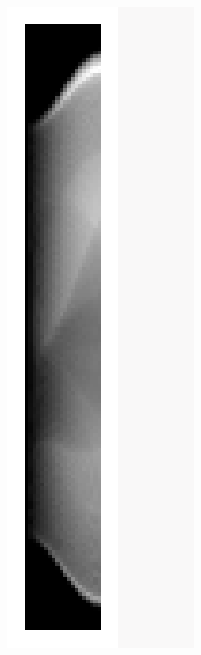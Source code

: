 \documentclass[12pt]{article}
\begin{document}
\begin{figure}
\begin{subfigure}{.073\textwidth}
    \includegraphics[width=\textwidth]{../figures/data-half.png}

\end{subfigure}
\end{figure}
\end{document}
